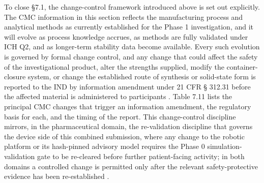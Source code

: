To close \S 7.1, the change-control framework introduced above is set out
explicitly. The CMC information in this section reflects the manufacturing process
and analytical methods as currently established for the Phase 1 investigation, and
it will evolve as process knowledge accrues, as methods are fully validated under
ICH Q2, and as longer-term stability data become available. Every such evolution
is governed by formal change control, and any change that could affect the safety
of the investigational product, alter the strengths supplied, modify the
container-closure system, or change the established route of synthesis or
solid-state form is reported to the IND by information amendment under 21 CFR \S
312.31 before the affected material is administered to participants
\cite{phase1guidance}. Table 7.11 lists the principal CMC changes that trigger an
information amendment, the regulatory basis for each, and the timing of the
report. This change-control discipline mirrors, in the pharmaceutical domain, the
re-validation discipline that governs the device side of this combined submission,
where any change to the robotic platform or its hash-pinned advisory model
requires the Phase 0 simulation-validation gate to be re-cleared before further
patient-facing activity; in both domains a controlled change is permitted only
after the relevant safety-protective evidence has been re-established
\cite{onpremwhippl}.

